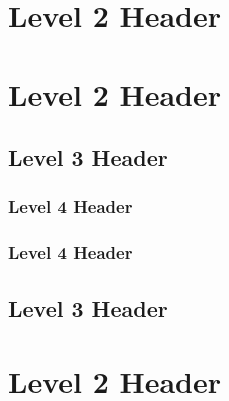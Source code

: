 \begin{abstract}
\lipsum[1]
\end{abstract}

\section{Level 2 Header}
\lipsum[2]
\section{Level 2 Header}
\lipsum[3-4]
\subsection{Level 3 Header}
\lipsum[5]
\subsubsection{Level 4 Header}
\lipsum[6]
\subsubsection{Level 4 Header}
\lipsum[7]
\subsection{Level 3 Header}
\lipsum[8]
\section{Level 2 Header}
\lipsum[9-10]
